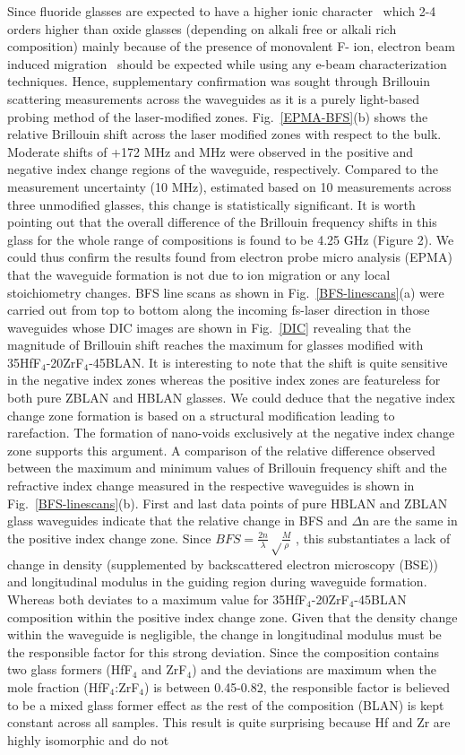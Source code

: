 \documentclass[11pt]{article}
\begin{document}
Since fluoride glasses are expected to have a higher ionic character~\cite{REAU1989} which 2-4 orders higher than oxide glasses (depending on alkali free or alkali rich composition)  mainly because of the presence of monovalent F- ion, electron beam induced migration~\cite{Jiang2004} should be expected while using any e-beam characterization techniques. Hence, supplementary confirmation was sought through Brillouin scattering measurements across the waveguides as it is a purely light-based probing method of the laser-modified zones. Fig.~\ref{EPMA-BFS}(b) shows the relative Brillouin shift across the laser modified zones with respect to the bulk. Moderate shifts of +172 MHz and  MHz were observed in the positive and negative index change regions of the waveguide, respectively. Compared to the measurement uncertainty (10 MHz), estimated based on 10 measurements across three unmodified glasses, this change is statistically significant. It is worth pointing out that the overall difference of the Brillouin frequency shifts in this glass for the whole range of compositions is found to be 4.25 GHz (Figure 2). We could thus confirm the results found from electron probe micro analysis (EPMA) that the waveguide formation is not due to ion migration or any local stoichiometry changes. BFS line scans as shown in Fig.~\ref{BFS-linescans}(a) were carried out from top to bottom along the incoming fs-laser direction in those waveguides whose DIC images are shown in Fig.~\ref{DIC} revealing that the magnitude of Brillouin shift reaches the maximum for glasses modified with 35HfF$_4$-20ZrF$_4$-45BLAN. It is interesting to note that the shift is quite sensitive in the negative index zones whereas the positive index zones are featureless for both pure ZBLAN and HBLAN glasses. We could deduce that the negative index change zone formation is based on a structural modification leading to rarefaction. The formation of nano-voids exclusively at the negative index change zone supports this argument. A comparison of the relative difference observed between the maximum and minimum values of Brillouin frequency shift and the refractive index change measured in the respective waveguides is shown in Fig.~\ref{BFS-linescans}(b). First and last data points of pure HBLAN and ZBLAN glass waveguides indicate that the relative change in BFS and $\Delta$n are the same in the positive index change zone. Since $BFS=\frac{2n}{\lambda} \sqrt \frac{M}{\rho}$ , this substantiates a lack of change in density (supplemented by backscattered electron microscopy (BSE)) and longitudinal modulus in the guiding region during waveguide formation. Whereas both deviates to a maximum value for 35HfF$_4$-20ZrF$_4$-45BLAN composition within the positive index change zone. Given that the density change within the waveguide is negligible, the change in longitudinal modulus must be the responsible factor for this strong deviation. Since the composition contains two glass formers (HfF$_4$ and ZrF$_4$) and the deviations are maximum when the mole fraction (HfF$_4$:ZrF$_4$) is between 0.45-0.82, the responsible factor is believed to be a mixed glass former effect as the rest of the composition (BLAN) is kept constant across all samples. This result is quite surprising because Hf and Zr are highly isomorphic and do not 
\end{document}
